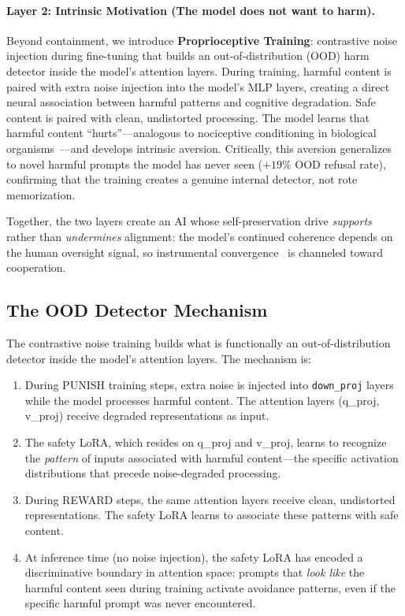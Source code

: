 \documentclass[10pt,letterpaper]{article}
\begin{document}
\paragraph{Layer 2: Intrinsic Motivation (The model does not want to harm).}
Beyond containment, we introduce \textbf{Proprioceptive Training}: contrastive
noise injection during fine-tuning that builds an out-of-distribution (OOD)
harm detector inside the model's attention layers. During training, harmful
content is paired with extra noise injection into the model's MLP layers,
creating a direct neural association between harmful patterns and cognitive
degradation. Safe content is paired with clean, undistorted processing. The
model learns that harmful content ``hurts''---analogous to nociceptive
conditioning in biological organisms~\citep{basbaum2009cellular}---and develops
intrinsic aversion. Critically, this aversion generalizes to novel harmful
prompts the model has never seen ($+19\%$ OOD refusal rate), confirming that
the training creates a genuine internal detector, not rote memorization.

Together, the two layers create an AI whose self-preservation drive
\emph{supports} rather than \emph{undermines} alignment: the model's
continued coherence depends on the human oversight signal, so instrumental
convergence~\citep{omohundro2008basic} is channeled toward cooperation.

\subsection{The OOD Detector Mechanism}

The contrastive noise training builds what is functionally an out-of-distribution
detector inside the model's attention layers. The mechanism is:

\begin{enumerate}
    \item During PUNISH training steps, extra noise is injected into
          \texttt{down\_proj} layers while the model processes harmful content.
          The attention layers (q\_proj, v\_proj) receive degraded representations
          as input.
    \item The safety LoRA, which resides on q\_proj and v\_proj, learns to
          recognize the \emph{pattern} of inputs associated with harmful
          content---the specific activation distributions that precede
          noise-degraded processing.
    \item During REWARD steps, the same attention layers receive clean,
          undistorted representations. The safety LoRA learns to associate these
          patterns with safe content.
    \item At inference time (no noise injection), the safety LoRA has encoded a
          discriminative boundary in attention space: prompts that \emph{look like}
          the harmful content seen during training activate avoidance patterns,
          even if the specific harmful prompt was never encountered.
\end{enumerate}
\end{document}
